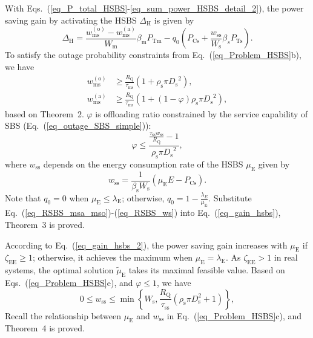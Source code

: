 \documentclass[12pt, draftclsnofoot,onecolumn]{IEEEtran}
\begin{document}
With Eqs.~(\ref{eq_P_total_HSBS}-\ref{eq_sum_power_HSBS_detail_2}), the power saving gain by activating the HSBS $\Delta_\mathrm{H}$ is given by
\begin{equation}\label{eq_gain_hsbs}
    \Delta_\mathrm{H} = \frac{w_\mathrm{ms}^{(\mathrm{o})}-w_\mathrm{ms}^{(\mathrm{a})}}{W_\mathrm{m}} \beta_\mathrm{m} P_\mathrm{Tm} - q_0 (P_{\mathrm{Cs}} + \frac{w_\mathrm{ss}}{W_\mathrm{s}} \beta_s P_\mathrm{Ts}).
\end{equation}
To satisfy the outage probability constraints from Eq.~(\ref{eq_Problem_HSBS}b), we have
\begin{subequations}\label{eq_RSBS_msa_mso}
    \begin{align}
    w_\mathrm{ms}^{(\mathrm{o})} & \geq \frac{R_\mathrm{Q}}{\tau_\mathrm{ms}} \left( 1+ \rho_\mathrm{s} \pi {D_\mathrm{s}}^2 \right), \\
    w_\mathrm{ms}^{(\mathrm{a})} & \geq \frac{R_\mathrm{Q}}{\tau_\mathrm{ms}} \left( 1+ (1-\varphi) \rho_\mathrm{s} \pi {D_\mathrm{s}}^2 \right),
    \end{align}
\end{subequations}
based on Theorem~2.
$\varphi$ is offloading ratio constrained by the service capability of SBS (Eq.~(\ref{eq_outage_SBS_simple})):
\begin{equation}\label{eq_ratio_offloaded}
    \varphi \leq \frac{\frac{\tau_{\mathrm{ss}} w_\mathrm{ss} }{R_\mathrm{Q}}-1}{\rho_\mathrm{s} \pi {D_\mathrm{s}}^2},
\end{equation}
where $w_\mathrm{ss}$ depends on the energy consumption rate of the HSBS $\mu_\mathrm{E}$ given by
\begin{equation}\label{eq_RSBS_ws}
    w_\mathrm{ss} = \frac{1}{\beta_\mathrm{s} W_\mathrm{s}} \left(\mu_\mathrm{E} E - P_{\mathrm{Cs}}\right).
\end{equation}
Note that $q_0=0$ when $\mu_\mathrm{E}\leq \lambda_\mathrm{E}$; otherwise, $q_0 = 1-\frac{\lambda_{E}}{\mu_\mathrm{E}}$.
Substitute Eq.~(\ref{eq_RSBS_msa_mso})-(\ref{eq_RSBS_ws}) into Eq.~(\ref{eq_gain_hsbs}), Theorem~3 is proved.

According to Eq.~(\ref{eq_gain_hsbs_2}), the power saving gain increases with $\mu_\mathrm{E}$ if $ \zeta_\mathrm{EE} \geq 1 $; otherwise, it achieves the maximum when $\mu_\mathrm{E}=\lambda_\mathrm{E}$.
As $\zeta_\mathrm{EE}>1$ in real systems, the optimal solution $\tilde{\mu}_\mathrm{E}$ takes its maximal feasible value.
Based on Eqs.~(\ref{eq_Problem_HSBS}e), and $\varphi \leq 1$,  we have
\begin{equation}\label{eq_w_s_HSBS_range}
    0\leq w_\mathrm{ss} \leq \min \left\{W_\mathrm{s}, \frac{R_\mathrm{Q}}{\tau_\mathrm{ss}}\left(\rho_\mathrm{s}\pi D_\mathrm{s}^2 +1 \right) \right\},
\end{equation}
Recall the relationship between $\mu_\mathrm{E}$ and $w_\mathrm{ss}$ in Eq.~(\ref{eq_Problem_HSBS}c), and Theorem~4 is proved.
\end{document}
